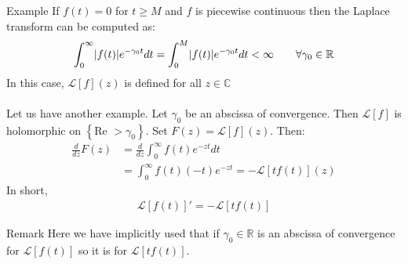 \begin{parag}{Example}
    If $f\left(t\right) =  0$ for $t \geq M$ and $f$ is piecewise continuous then the Laplace transform can be computed as:
	\begin{align*} 
		\int_{0}^{\infty}\left|f\left(t\right)\right|e^{-\gamma_0 t}dt =  \int_{0}^{M}\left|f\left(t\right)\right|e^{-\gamma_0 t}dt < \infty \mathspace \mathspace \forall \gamma_0 \in \mathbb{R}
	\end{align*}
	In this case, $\mathcal{L}\left[f\right]\left(z\right)$ is defined for all $z \in \mathbb{C}$\\
	$ $\\
	Let us have another example. Let $\gamma_0$ be an abscissa of convergence. Then $\mathcal{L}\left[f\right]$ is holomorphic on $\left\{\text{Re } > \gamma_0\right\}$. Set $F\left(z\right) =  \mathcal{L}\left[f\right]\left(z\right)$. Then:
\begin{align*} 
	\frac{d}{dz} F\left(z\right) &= \frac{d }{dz} \int_{0}^{\infty}f\left(t\right)e^{-zt}dt\\
	&= \int_{0}^{\infty}f\left(t\right)\left(-t\right)e^{-zt} =  -\mathcal{L}\left[tf\left(t\right)\right]\left(z\right)
\end{align*}
	In short, 
	\begin{align*} 
		\mathcal{L}\left[f\left(t\right)\right]' =  - \mathcal{L}\left[tf\left(t\right)\right]
	\end{align*}
	\begin{subparag}{Remark}
	    Here we have implicitly used that if $\gamma_0 \in \mathbb{R}$ is an abscissa of convergence for $\mathcal{L}\left[f\left(t\right)\right]$ so it is for $\mathcal{L}\left[tf\left(t\right)\right]$.
	\end{subparag}
\end{parag}



